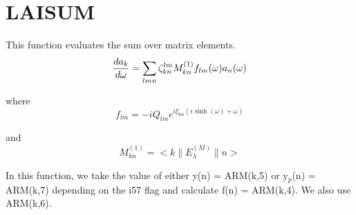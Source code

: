 \section{LAISUM}
\label{sect:laisum}

\noindent This function evaluates the sum over matrix elements.\\

\begin{equation}
{da_k \over d\omega} = 
\sum_{lmn} \zeta^{lm}_{kn}  M^{(1)}_{kn} f_{lm}(\omega) a_n(\omega)
\end{equation}

\noindent where\\

\begin{equation}
f_{lm} = -i Q_{lm} e^{i \xi_{kn} (\epsilon \sinh(\omega) + \omega)}
\end{equation}

\noindent and\\

\begin{equation}
M^{(1)}_{kn} = <k \parallel E^{(M)}_\lambda \parallel n>
\end{equation}

In this function, we take the value of either y(n) = ARM(k,5) or y$_p$(n) = 
ARM(k,7) depending on the i57 flag and calculate f(n) = ARM(k,4). We also
use ARM(k,6).\\
